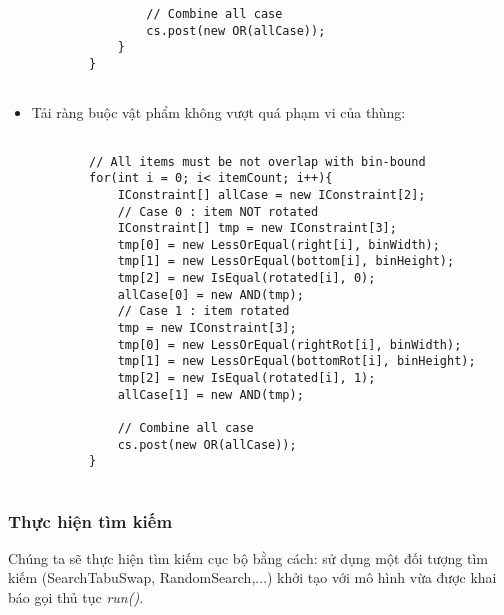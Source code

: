 \begin{itemize}
\begin{lstlisting}
				// Combine all case
				cs.post(new OR(allCase));
			}
		}
		
		\end{lstlisting}
		
		\item Tải ràng buộc vật phẩm không vượt quá phạm vi của thùng:
		\begin{lstlisting}
		
		// All items must be not overlap with bin-bound
		for(int i = 0; i< itemCount; i++){
			IConstraint[] allCase = new IConstraint[2];
			// Case 0 : item NOT rotated
			IConstraint[] tmp = new IConstraint[3];
			tmp[0] = new LessOrEqual(right[i], binWidth);
			tmp[1] = new LessOrEqual(bottom[i], binHeight);
			tmp[2] = new IsEqual(rotated[i], 0);
			allCase[0] = new AND(tmp);
			// Case 1 : item rotated
			tmp = new IConstraint[3];
			tmp[0] = new LessOrEqual(rightRot[i], binWidth);
			tmp[1] = new LessOrEqual(bottomRot[i], binHeight);
			tmp[2] = new IsEqual(rotated[i], 1);
			allCase[1] = new AND(tmp);
			
			// Combine all case
			cs.post(new OR(allCase));
		}
		
		\end{lstlisting}
		
	\end{itemize}
	
\subsubsection{Thực hiện tìm kiếm}
Chúng ta sẽ thực hiện tìm kiếm cục bộ bằng cách: sử dụng một đối tượng tìm kiếm (\textsf{SearchTabuSwap}, \textsf{RandomSearch},$\dots$) khởi tạo với mô hình vừa được khai báo gọi thủ tục \textit{run()}.

